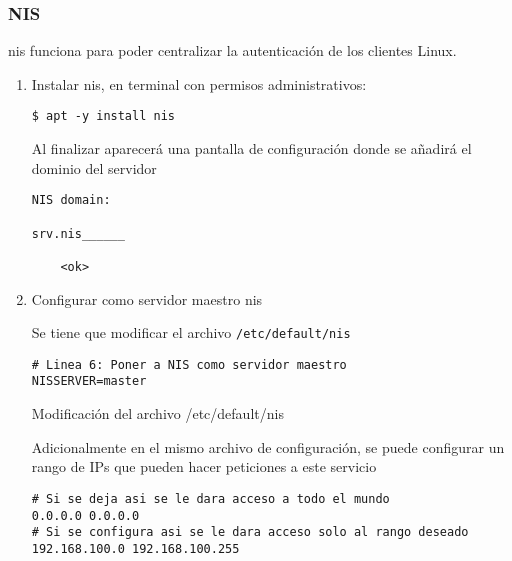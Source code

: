 \documentclass[../main.tex]{subfiles}
\begin{document}
\subsubsection{NIS}\label{sec:nis}

\acrshort{nis} funciona para poder centralizar la autenticación de los clientes Linux.

\begin{enumerate}
  \item Instalar \acrshort{nis}, en terminal con permisos administrativos:

        \begin{listing}[H]
\begin{verbatim}
$ apt -y install nis
\end{verbatim}
\end{listing}

        Al finalizar aparecerá una pantalla de configuración donde se
        añadirá el dominio del servidor

        \begin{listing}[H]
\begin{verbatim}
NIS domain:

srv.nis______

    <ok>
\end{verbatim}
\end{listing}

  \item Configurar como servidor maestro \acrshort{nis}

        Se tiene que modificar el archivo \texttt{/etc/default/nis}

        \begin{listing}[H]
\begin{verbatim}
# Linea 6: Poner a NIS como servidor maestro
NISSERVER=master
\end{verbatim}
    \caption{Modificación del archivo /etc/default/nis}
    \label{listing:nis}
\end{listing}

        Adicionalmente en el mismo archivo de configuración, se puede
        configurar un rango de IPs que pueden hacer peticiones
        a este servicio

        \begin{listing}[H]
\begin{verbatim}
# Si se deja asi se le dara acceso a todo el mundo
0.0.0.0 0.0.0.0
# Si se configura asi se le dara acceso solo al rango deseado
192.168.100.0 192.168.100.255
\end{verbatim}
\end{listing}


\end{enumerate}
\end{document}

